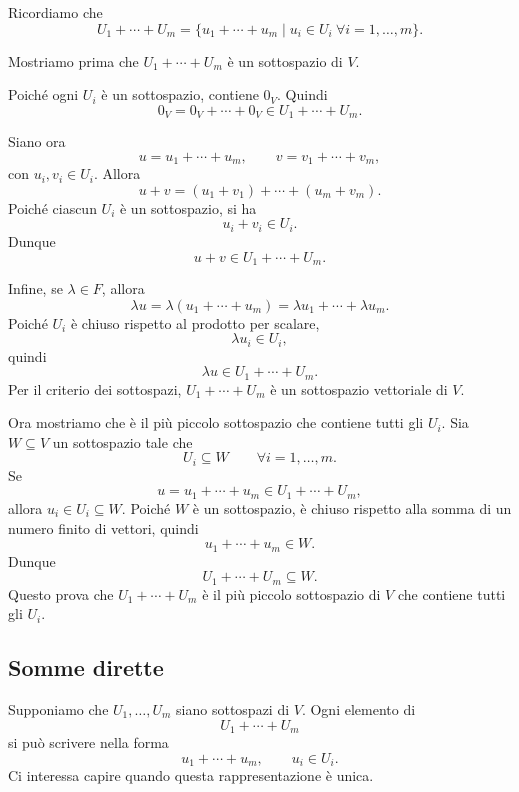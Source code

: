 \documentclass[a4paper]{article}
\begin{document}
\begin{snippetproof}{}
    Ricordiamo che
    \[
        U_1+\cdots+U_m
        =
        \{u_1+\cdots+u_m\mid u_i\in U_i\ \forall i=1,\ldots,m\}.
    \]

    Mostriamo prima che \(U_1+\cdots+U_m\) è un sottospazio di \(V\).

    Poiché ogni \(U_i\) è un sottospazio, contiene \(0_V\). Quindi
    \[
        0_V=0_V+\cdots+0_V\in U_1+\cdots+U_m.
    \]

    Siano ora
    \[
        u=u_1+\cdots+u_m,
        \qquad
        v=v_1+\cdots+v_m,
    \]
    con \(u_i,v_i\in U_i\). Allora
    \[
        u+v
        =
        (u_1+v_1)+\cdots+(u_m+v_m).
    \]
    Poiché ciascun \(U_i\) è un sottospazio, si ha
    \[
        u_i+v_i\in U_i.
    \]
    Dunque
    \[
        u+v\in U_1+\cdots+U_m.
    \]

    Infine, se \(\lambda\in F\), allora
    \[
        \lambda u
        =
        \lambda(u_1+\cdots+u_m)
        =
        \lambda u_1+\cdots+\lambda u_m.
    \]
    Poiché \(U_i\) è chiuso rispetto al prodotto per scalare,
    \[
        \lambda u_i\in U_i,
    \]
    quindi
    \[
        \lambda u\in U_1+\cdots+U_m.
    \]
    Per il criterio dei sottospazi, \(U_1+\cdots+U_m\) è un sottospazio vettoriale di \(V\).

    Ora mostriamo che è il più piccolo sottospazio che contiene tutti gli \(U_i\). Sia \(W\subseteq V\) un sottospazio tale che
    \[
        U_i\subseteq W
        \qquad
        \forall i=1,\ldots,m.
    \]
    Se
    \[
        u=u_1+\cdots+u_m\in U_1+\cdots+U_m,
    \]
    allora \(u_i\in U_i\subseteq W\). Poiché \(W\) è un sottospazio, è chiuso rispetto alla somma di un numero finito di vettori, quindi
    \[
        u_1+\cdots+u_m\in W.
    \]
    Dunque
    \[
        U_1+\cdots+U_m\subseteq W.
    \]
    Questo prova che \(U_1+\cdots+U_m\) è il più piccolo sottospazio di \(V\) che contiene tutti gli \(U_i\).
\end{snippetproof}

\subsection{Somme dirette}

Supponiamo che \(U_1,\ldots,U_m\) siano sottospazi di \(V\). Ogni elemento di
\[
    U_1+\cdots+U_m
\]
si può scrivere nella forma
\[
    u_1+\cdots+u_m,
    \qquad
    u_i\in U_i.
\]
Ci interessa capire quando questa rappresentazione è unica.
\end{document}
